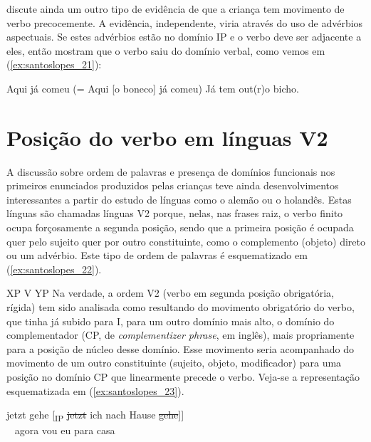 \documentclass[output=paper]{LSP/langsci}
\begin{document}
\citet{lopes2009} discute ainda um outro tipo de evidência de que a criança tem movimento de verbo precocemente. A evidência, independente, viria através do uso de advérbios aspectuais. Se estes advérbios estão no domínio IP e o verbo deve ser adjacente a eles, então mostram que o verbo saiu do domínio verbal, como vemos em (\ref{ex:santoslopes_21}):

\ea\label{ex:santoslopes_21}
\ea\label{ex:santoslopes_21a}
Aqui já comeu (= Aqui [o boneco] já comeu)
\ex\label{ex:santoslopes_21b}
Já tem out(r)o bicho.
\zl

\section{Posição do verbo em línguas V2}
\label{sec:santoslopes_posicao_verbo_v2}

A discussão sobre ordem de palavras e presença de domínios funcionais nos primeiros enunciados produzidos pelas crianças teve ainda desenvolvimentos interessantes a partir do estudo de línguas como o alemão ou o holandês. Estas línguas são chamadas línguas V2 porque, nelas, nas frases raiz, o verbo finito ocupa forçosamente a segunda posição, sendo que a primeira posição é ocupada quer pelo sujeito quer por outro constituinte, como o complemento (objeto) direto ou um advérbio. Este tipo de ordem de palavras é esquematizado em (\ref{ex:santoslopes_22}).

\ea\label{ex:santoslopes_22}
XP V YP
\z
Na verdade, a ordem V2 (verbo em segunda posição obrigatória, rígida) tem sido analisada como resultando do movimento obrigatório do verbo, que tinha já subido para I, para um outro domínio mais alto, o domínio do complementador (CP, de \textit{complementizer phrase}, em inglês), mais propriamente para a posição de núcleo desse domínio. Esse movimento seria acompanhado do movimento de um outro constituinte (sujeito, objeto, modificador) para uma posição no domínio CP que linearmente precede o verbo. Veja-se a representação esquematizada em (\ref{ex:santoslopes_23}).

\ea\label{ex:santoslopes_23}
\gll {[\textsubscript{CP}} jetzt {gehe [\textsubscript{IP} \sout{jetzt}} ich nach Hause \sout{gehe}]]\\
~ agora vou eu para casa\\
\z
\end{document}

